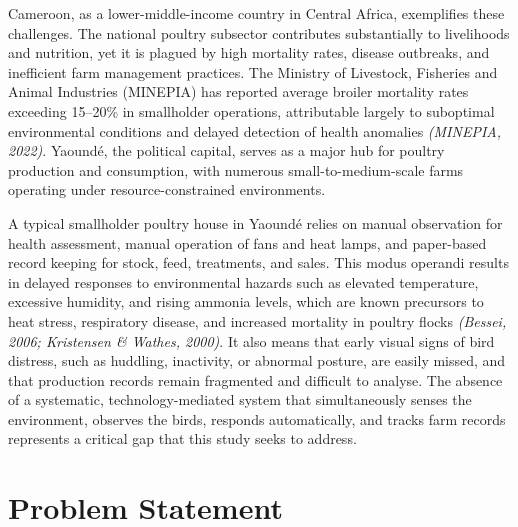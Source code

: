 \documentclass[12pt,a4paper]{report}
\begin{document}
Cameroon, as a lower-middle-income country in Central Africa, exemplifies these challenges. The national poultry subsector contributes substantially to livelihoods and nutrition, yet it is plagued by high mortality rates, disease outbreaks, and inefficient farm management practices. The Ministry of Livestock, Fisheries and Animal Industries (MINEPIA) has reported average broiler mortality rates exceeding 15--20\% in smallholder operations, attributable largely to suboptimal environmental conditions and delayed detection of health anomalies \textit{(MINEPIA, 2022)}. Yaound\'e, the political capital, serves as a major hub for poultry production and consumption, with numerous small-to-medium-scale farms operating under resource-constrained environments.

A typical smallholder poultry house in Yaound\'e relies on manual observation for health assessment, manual operation of fans and heat lamps, and paper-based record keeping for stock, feed, treatments, and sales. This modus operandi results in delayed responses to environmental hazards such as elevated temperature, excessive humidity, and rising ammonia levels, which are known precursors to heat stress, respiratory disease, and increased mortality in poultry flocks \textit{(Bessei, 2006; Kristensen \& Wathes, 2000)}. It also means that early visual signs of bird distress, such as huddling, inactivity, or abnormal posture, are easily missed, and that production records remain fragmented and difficult to analyse. The absence of a systematic, technology-mediated system that simultaneously senses the environment, observes the birds, responds automatically, and tracks farm records represents a critical gap that this study seeks to address.

\section{Problem Statement}
\end{document}
